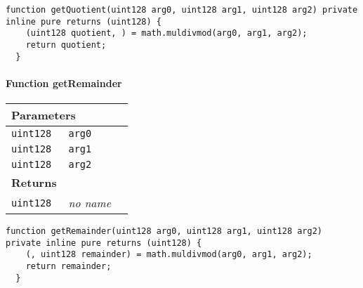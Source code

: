 \begin{lstlisting}[firstnumber=48]
  function getQuotient(uint128 arg0, uint128 arg1, uint128 arg2) private inline pure returns (uint128) {
    (uint128 quotient, ) = math.muldivmod(arg0, arg1, arg2);
    return quotient;
  }
\end{lstlisting}

\paragraph{Function getRemainder}


\ifsoltables
\noindent\begin{tabular}{|l|l|p{5cm}|}\hline
\multicolumn{3}{|l|}{\bf Parameters}\\\hline
\tt uint128 & \tt arg0 &\\\hline
\tt uint128 & \tt arg1 &\\\hline
\tt uint128 & \tt arg2 &\\\hline
\multicolumn{3}{|l|}{\bf Returns}\\\hline
\tt uint128 & {\em no name} &\\\hline
\end{tabular}
\fi

\vspace{2cm}

\begin{lstlisting}[firstnumber=54]
  function getRemainder(uint128 arg0, uint128 arg1, uint128 arg2) private inline pure returns (uint128) {
    (, uint128 remainder) = math.muldivmod(arg0, arg1, arg2);
    return remainder;
  }
\end{lstlisting}
